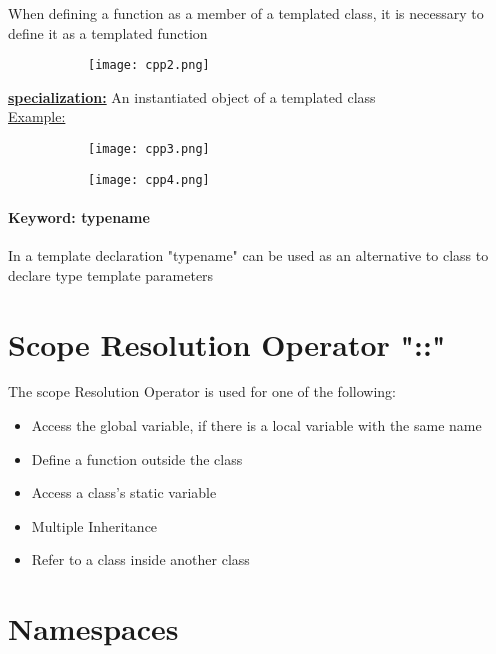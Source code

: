 \documentclass[8pt]{extreport}
\begin{document}
When defining a function as a member of a templated class, it is necessary to define it as a templated function
\begin{figure}[H]
\centering
\begin{subfigure}[b]{0.4\linewidth}
\texttt{[image: cpp2.png]}
\end{subfigure}
\end{figure}

\underline{\textbf{specialization:}} An instantiated object of a templated class\\
\underline{Example:}
\begin{figure}[H]
\centering
\begin{subfigure}[b]{0.3\linewidth}
\texttt{[image: cpp3.png]}
\end{subfigure}
\begin{subfigure}[b]{0.5\linewidth}
\texttt{[image: cpp4.png]}
\end{subfigure}
\end{figure}

\paragraph{Keyword: typename} In a template declaration "typename" can be used as an alternative to class to declare type template parameters
\section{Scope Resolution Operator "::"}

The scope Resolution Operator is used for one of the following:

\begin{itemize}
\item Access the global variable, if there is a local variable with the same name
\item Define a function outside the class
\item Access a class's static variable
\item Multiple Inheritance
\item Refer to a class inside another class
\end{itemize}

\section{Namespaces}
\end{document}
